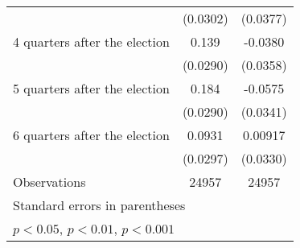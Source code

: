 \begin{table}[htbp]
\begin{tabular}{l*{2}{c}}
                    &    (0.0302)         &    (0.0377)         \\
[1em]
 4 quarters after the election&       0.139\sym{***}&     -0.0380         \\
                    &    (0.0290)         &    (0.0358)         \\
[1em]
 5 quarters after the election&       0.184\sym{***}&     -0.0575         \\
                    &    (0.0290)         &    (0.0341)         \\
[1em]
 6 quarters after the election&      0.0931\sym{**} &     0.00917         \\
                    &    (0.0297)         &    (0.0330)         \\
\hline
Observations        &       24957         &       24957         \\
\hline\hline
\multicolumn{3}{l}{\footnotesize Standard errors in parentheses}\\
\multicolumn{3}{l}{\footnotesize \sym{*} \(p<0.05\), \sym{**} \(p<0.01\), \sym{***} \(p<0.001\)}\\
\end{tabular}
\end{table}

